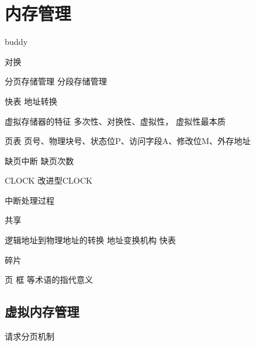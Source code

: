 \chapter{内存管理}
buddy

对换

分页存储管理
分段存储管理

快表
地址转换

虚拟存储器的特征
多次性、对换性、虚拟性，
虚拟性最本质

页表
页号、物理块号、状态位P、访问字段A、修改位M、外存地址

缺页中断
缺页次数

CLOCK
改进型CLOCK

中断处理过程

共享

逻辑地址到物理地址的转换
地址变换机构
快表


碎片

页
框
等术语的指代意义



\section{虚拟内存管理}
请求分页机制
